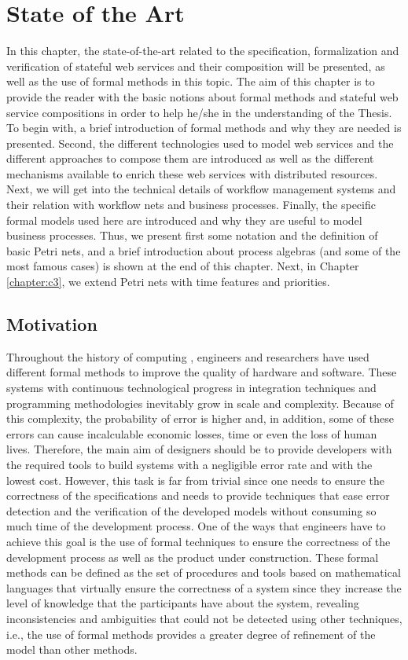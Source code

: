 \chapter{State of the Art}\label{chapter:c2}
In this chapter, the state-of-the-art 
related to the specification, formalization and verification
of stateful web services and their composition will be presented, 
as well as the use of formal methods in this topic. The aim of this chapter is to provide the reader
with the basic notions about formal methods and stateful web service compositions in order to help he/she in the understanding
of the Thesis. To begin with, a brief introduction of formal methods 
and why they are needed is presented. Second, the different technologies used to model web services
and the different approaches to compose them are introduced as well as 
the different mechanisms available to enrich
these web services with distributed resources. 
Next, we will get into the technical details of workflow management systems and their relation 
with workflow nets and business processes.
Finally, the specific formal models used here are introduced and why they are useful to model business processes. 
Thus, we present first some notation and the definition of basic Petri nets, and a 
brief introduction about process algebras (and some of the most famous cases) is shown at the end
of this chapter. Next, in Chapter \ref{chapter:c3}, we extend Petri nets with time features and priorities.

\section{Motivation}

Throughout the history of computing , engineers and researchers have used different formal methods to improve the quality of hardware and software. These systems with continuous technological progress in integration techniques and programming methodologies inevitably grow in scale and complexity. Because of this complexity, the probability of error is higher and, in addition, some of these errors can cause incalculable economic losses, time or even the loss of human lives. Therefore, the main aim of designers should be to provide developers with the required tools to build systems with a negligible error rate and with the lowest cost. However, this task is far from trivial since one needs to ensure the correctness of the specifications and needs to provide techniques that ease error detection and the verification of the developed models without consuming so much time of the development process. One of the ways that engineers have to achieve this goal is the use of formal techniques to ensure the correctness of the development process as well as the product under construction. These formal methods can be defined as the set of procedures and tools based on mathematical languages that virtually ensure the correctness of a system \cite{Clarke96} since they increase the level of knowledge that the participants have about the system, revealing inconsistencies and ambiguities that could not be detected using other techniques, i.e., the use of formal methods provides a greater degree of refinement of the model than other methods.


